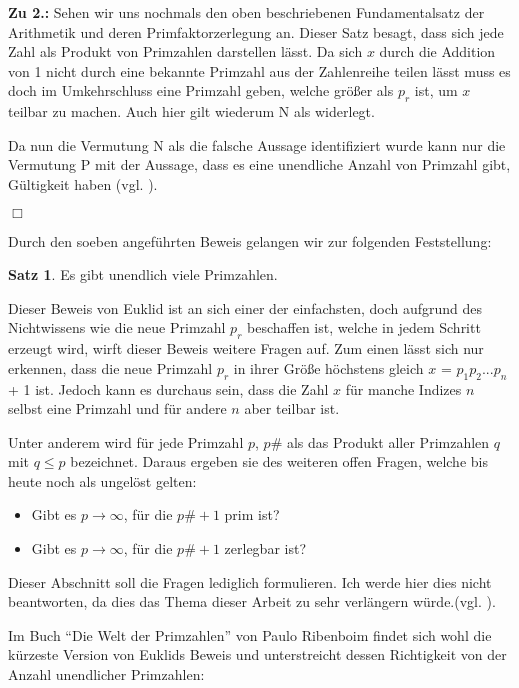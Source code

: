 \documentclass[12pt,a4paper]{article}
\theoremstyle{definition}
\newtheorem{satz}{Satz}[subsection]
\begin{document}
\textbf{Zu 2.:} Sehen wir uns nochmals den oben beschriebenen Fundamentalsatz der Arithmetik und deren Primfaktorzerlegung an.
Dieser Satz besagt, dass sich jede Zahl als Produkt von Primzahlen darstellen lässt.
Da sich $x$ durch die Addition von 1 nicht durch eine bekannte Primzahl aus der Zahlenreihe teilen lässt muss es doch im Umkehrschluss eine Primzahl geben, welche größer als $p_r$ ist, um $x$ teilbar zu machen.
Auch hier gilt wiederum N als widerlegt.

Da nun die Vermutung N als die falsche Aussage identifiziert wurde kann nur die Vermutung P mit der Aussage, dass es eine unendliche Anzahl von Primzahl gibt, Gültigkeit haben (vgl. \cite[3]{Ribenboim2006}).
\begin{flushright}
$\Box$
\end{flushright}

Durch den soeben angeführten Beweis gelangen wir zur folgenden Feststellung:
\begin{satz}Es gibt unendlich viele Primzahlen.\end{satz}

Dieser Beweis von Euklid ist an sich einer der einfachsten, doch aufgrund des Nichtwissens wie die neue Primzahl $p_r$ beschaffen ist, welche in jedem Schritt erzeugt wird, wirft dieser Beweis weitere Fragen auf.
Zum einen lässt sich nur erkennen, dass die neue Primzahl $p_r$ in ihrer Größe höchstens gleich\newline
$x$ = $p_1p_2...p_n$ + 1 ist. Jedoch kann es durchaus sein, dass die Zahl $x$ für manche Indizes $n$ selbst eine Primzahl und für andere $n$ aber teilbar ist.

Unter anderem wird für jede Primzahl $p$, $p\#$ als das Produkt aller Primzahlen $q$ mit $q \leq p$ bezeichnet. 
Daraus ergeben sie des weiteren offen Fragen, welche bis heute noch als ungelöst gelten:
\begin{itemize}
    \item Gibt es $p \to \infty$, für die $p\# +1$ prim ist?
    \item Gibt es $p \to \infty$, für die $p\# +1$ zerlegbar ist?
\end{itemize}
Dieser Abschnitt soll die Fragen lediglich formulieren.
Ich werde hier dies nicht beantworten, da dies das Thema dieser Arbeit zu sehr verlängern würde.(vgl. \cite[4]{Ribenboim2006}).

Im Buch “Die Welt der Primzahlen” von Paulo Ribenboim findet sich wohl die kürzeste Version von Euklids Beweis und unterstreicht dessen Richtigkeit von der Anzahl unendlicher Primzahlen:
\end{document}
